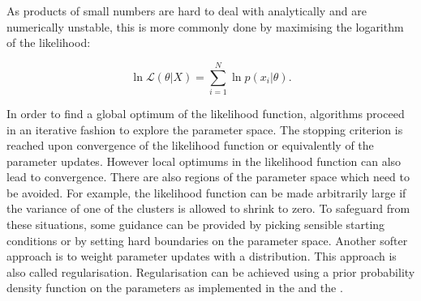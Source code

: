 As products of small numbers are hard to deal with analytically and are numerically unstable,
this is more commonly done by maximising the logarithm of the likelihood:


\[
\ln \mathcal{L}(\theta |X) = \sum_{i=1}^N \ln p(x_i|\theta).
\]

In order to find a global optimum of the likelihood function, algorithms proceed in an iterative fashion to explore the parameter space.
The stopping criterion is reached upon convergence of the likelihood function or equivalently of the parameter updates.
However local optimums in the likelihood function can also lead to convergence.
There are also regions of the parameter space which need to be avoided.
For example, the likelihood function can be made arbitrarily large if the variance of one of the clusters is allowed to shrink to zero.
To safeguard from these situations,
some guidance can be provided by picking sensible starting conditions or by setting hard boundaries on the parameter space.
Another softer approach is to weight parameter updates with a distribution.
This approach is also called regularisation.
Regularisation can be achieved using a prior probability density function on the parameters as implemented in the 
and the .


